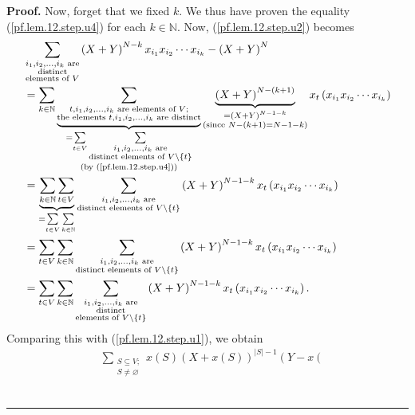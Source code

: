 \documentclass[numbers=enddot,12pt,final,onecolumn,notitlepage]{scrartcl}%
\theoremstyle{definition}
\newenvironment{proof}[1][Proof]{\noindent\textbf{#1.} }{\ \rule{0.5em}{0.5em}}
\let\sumnonlimits\sum
\renewcommand{\sum}{\sumnonlimits\limits}
\newenvironment{verlong}{}{}
\begin{document}
\begin{verlong}
\begin{proof}
Now, forget that we fixed $k$. We thus have proven the equality
(\ref{pf.lem.12.step.u4}) for each $k\in\mathbb{N}$. Now,
(\ref{pf.lem.12.step.u2}) becomes%
\begin{align*}
&  \sum_{\substack{i_{1},i_{2},\ldots,i_{k}\text{ are}\\\text{distinct}%
\\\text{elements of }V}}\left(  X+Y\right)  ^{N-k}x_{i_{1}}x_{i_{2}}\cdots
x_{i_{k}}-\left(  X+Y\right)  ^{N}\\
&  =\sum_{k\in\mathbb{N}}\underbrace{\sum_{\substack{t,i_{1},i_{2}%
,\ldots,i_{k}\text{ are elements of }V;\\\text{the elements }t,i_{1}%
,i_{2},\ldots,i_{k}\text{ are distinct}}}}_{\substack{=\sum_{t\in V}%
\sum_{\substack{i_{1},i_{2},\ldots,i_{k}\text{ are}\\\text{distinct elements
of }V\setminus\left\{  t\right\}  }}\\\text{(by (\ref{pf.lem.12.step.u4}))}%
}}\underbrace{\left(  X+Y\right)  ^{N-\left(  k+1\right)  }}%
_{\substack{=\left(  X+Y\right)  ^{N-1-k}\\\text{(since }N-\left(  k+1\right)
=N-1-k\text{)}}}x_{t}\left(  x_{i_{1}}x_{i_{2}}\cdots x_{i_{k}}\right) \\
&  =\underbrace{\sum_{k\in\mathbb{N}}\sum_{t\in V}}_{=\sum_{t\in V}\sum
_{k\in\mathbb{N}}}\sum_{\substack{i_{1},i_{2},\ldots,i_{k}\text{
are}\\\text{distinct elements of }V\setminus\left\{  t\right\}  }}\left(
X+Y\right)  ^{N-1-k}x_{t}\left(  x_{i_{1}}x_{i_{2}}\cdots x_{i_{k}}\right) \\
&  =\sum_{t\in V}\sum_{k\in\mathbb{N}}\sum_{\substack{i_{1},i_{2},\ldots
,i_{k}\text{ are}\\\text{distinct elements of }V\setminus\left\{  t\right\}
}}\left(  X+Y\right)  ^{N-1-k}x_{t}\left(  x_{i_{1}}x_{i_{2}}\cdots x_{i_{k}%
}\right) \\
&  =\sum_{t\in V}\sum_{k\in\mathbb{N}}\sum_{\substack{i_{1},i_{2},\ldots
,i_{k}\text{ are}\\\text{distinct}\\\text{elements of }V\setminus\left\{
t\right\}  }}\left(  X+Y\right)  ^{N-1-k}x_{t}\left(  x_{i_{1}}x_{i_{2}}\cdots
x_{i_{k}}\right)  .
\end{align*}
Comparing this with (\ref{pf.lem.12.step.u1}), we obtain%
\begin{align}
&  \sum_{\substack{S\subseteq V;\\S\neq\varnothing}}x\left(  S\right)  \left(
X+x\left(  S\right)  \right)  ^{\left\vert S\right\vert -1}\left(  Y-x\left(

\end{align}
\end{proof}
\end{verlong}
\end{document}

